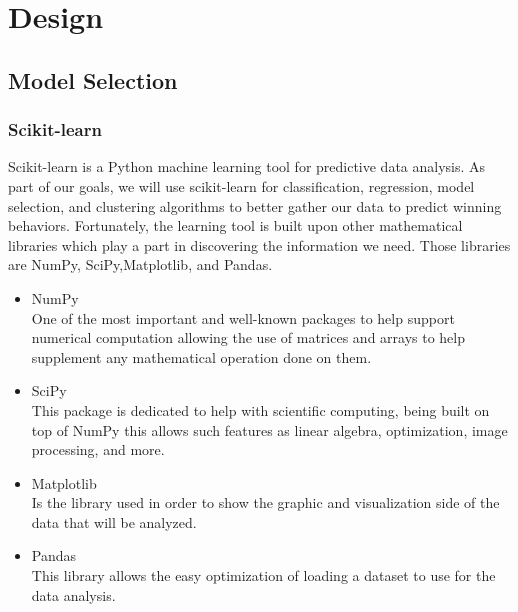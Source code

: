 \documentclass[a4paper,12pt]{report}
\begin{document}

\chapter{Design}
\section{Model Selection}
\subsection{Scikit-learn}

Scikit-learn is a Python machine learning tool for predictive data analysis. As part of our goals, we will use scikit-learn for classification, regression, model selection, and clustering algorithms to better gather our data to predict winning behaviors. Fortunately, the learning tool is built upon other mathematical libraries which play a part in discovering the information we need. Those libraries are NumPy, SciPy,Matplotlib, and Pandas.

\begin{itemize}[,]
    \setlength\itemsep{-.1cm}
    \item NumPy \\
    One of the most important and well-known packages to help support numerical computation allowing the use of matrices and arrays to help supplement any mathematical operation done on them.
    \item SciPy \\
    This package is dedicated to help with scientific computing, being built on top of NumPy this allows such features as linear algebra, optimization, image processing, and more.
    \item Matplotlib \\
    Is the library used in order to show the graphic and visualization side of the data that will be analyzed.
    \item Pandas \\
    This library allows the easy optimization of loading a dataset to use for the data analysis.
\end{itemize}
\end{document}
